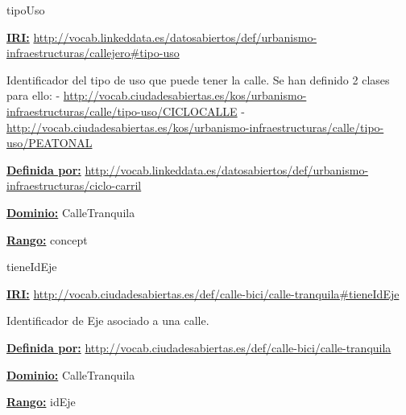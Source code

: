 \begin{mybox}{tipoUso}
\begin{flushleft}
\underline{\textbf{IRI:}}
\url{http://vocab.linkeddata.es/datosabiertos/def/urbanismo-infraestructuras/callejero#tipo-uso}
\newline

Identificador del tipo de uso que puede tener la calle. Se han definido 2 clases para ello:
\newline -	\url{http://vocab.ciudadesabiertas.es/kos/urbanismo-infraestructuras/calle/tipo-uso/CICLOCALLE}
\newline -	 \url{http://vocab.ciudadesabiertas.es/kos/urbanismo-infraestructuras/calle/tipo-uso/PEATONAL}
\newline


\underline{\textbf{Definida por:}}
\url{http://vocab.linkeddata.es/datosabiertos/def/urbanismo-infraestructuras/ciclo-carril}
\newline

\underline{\textbf{Dominio:}}
\newline CalleTranquila

\underline{\textbf{Rango:}}
		concept


\end{flushleft}
\end{mybox}



\begin{mybox}{tieneIdEje}
\begin{flushleft}
\underline{\textbf{IRI:}}
\url{http://vocab.ciudadesabiertas.es/def/calle-bici/calle-tranquila#tieneIdEje}
\newline

Identificador de Eje asociado a una calle.
\newline

\underline{\textbf{Definida por:}}
\url{http://vocab.ciudadesabiertas.es/def/calle-bici/calle-tranquila}
\newline

\underline{\textbf{Dominio:}}
		CalleTranquila
\newline

\underline{\textbf{Rango:}}
		idEje

\end{flushleft}
\end{mybox}





